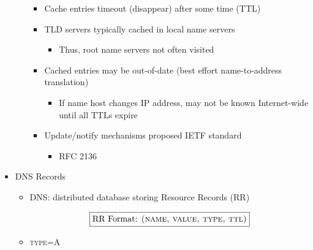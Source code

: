 \begin{itemize}
\begin{itemize}
        \begin{itemize}

          \item Cache entries timeout (disappear) after some time (TTL)

          \item TLD servers typically cached in local name servers

            \begin{itemize}

              \item Thus, root name servers not often visited

            \end{itemize}

          \item Cached entries may be out-of-date (best effort name-to-address translation)

            \begin{itemize}

              \item If name host changes IP address, may not be known Internet-wide until all TTLs expire

            \end{itemize}

          \item Update/notify mechanisms proposed IETF standard

            \begin{itemize}

              \item RFC 2136

            \end{itemize}

        \end{itemize}

    \end{itemize}

  \item DNS Records

    \begin{itemize}

      \item DNS: distributed database storing Resource Records (RR)

        $$\boxed{\text{RR Format: \textsc{(name, value, type, ttl)}}}$$

      \item \textsc{type=A}

        \begin{itemize}


\end{itemize}
\end{itemize}
\end{itemize}
